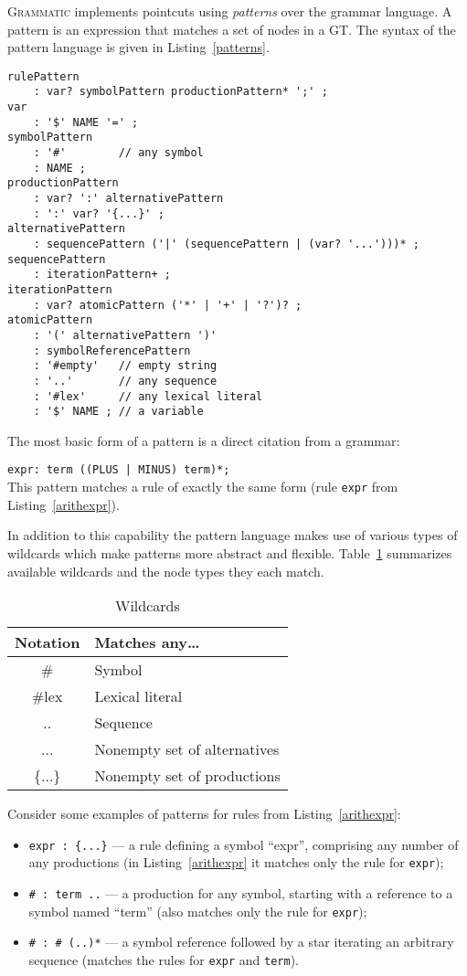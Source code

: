 \documentclass{IOS-Book-Article}     %
\newcommand{\tabref}[1]{Table~\ref{#1}}
\newcommand{\lstref}[1]{Listing~\ref{#1}}
\newcommand{\tool}[1]{\textsc{#1}}
\newcommand{\Grammatic}[0]{\tool{Grammatic}}
\begin{document}
\Grammatic{} implements pointcuts using \emph{patterns} over the grammar language. A pattern is an expression that matches a set of nodes in a GT. The syntax of the pattern language is given in \lstref{patterns}. 
\begin{lstlisting}[language=Grammatic,label=patterns,float,caption=Grammar of the pattern language]
rulePattern 
	: var? symbolPattern productionPattern* ';' ;
var 
	: '$' NAME '=' ;
symbolPattern
	: '#'        // any symbol 
	: NAME ;
productionPattern 
	: var? ':' alternativePattern
	: ':' var? '{...}' ;
alternativePattern 
	: sequencePattern ('|' (sequencePattern | (var? '...')))* ;
sequencePattern
	: iterationPattern+ ;
iterationPattern
	: var? atomicPattern ('*' | '+' | '?')? ;
atomicPattern
	: '(' alternativePattern ')'
	: symbolReferencePattern
	: '#empty'   // empty string
	: '..'       // any sequence
	: '#lex'     // any lexical literal
	: '$' NAME ; // a variable
\end{lstlisting}

The most basic form of a pattern is a direct citation from a grammar:

\lstinline!expr: term ((PLUS | MINUS) term)*;!\\
This pattern matches a rule of exactly the same form (rule \texttt{expr} from \lstref{arithexpr}). 

In addition to this capability the pattern language makes use of various types of wildcards which make patterns more abstract and flexible. \tabref{wildcards} summarizes available wildcards and the node types they each match.

\begin{table}[h!]
\centering
\begin{tabular}{|@{\tt}c|l|}
	\hline
	\bf Notation & \bf Matches any\ldots \\
	\hline
	\# & Symbol \\
	\#lex & Lexical literal \\
	.. & Sequence \\
	... & Nonempty set of alternatives \\
	\{...\} & Nonempty set of productions \\
	\hline
\end{tabular}
\caption{Wildcards}\label{wildcards}
\end{table}

Consider some examples of patterns for rules from \lstref{arithexpr}:
\begin{itemize}
	\item \lstinline!expr : {...}! --- a rule defining a symbol ``expr'', comprising any number of any productions (in \lstref{arithexpr} it matches only the rule for \texttt{expr});
	\item \lstinline!# : term ..! --- a production for any symbol, starting with a reference to a symbol named ``term'' (also matches only the rule for \texttt{expr});
	\item \lstinline!# : # (..)*! --- a symbol reference followed by a star iterating an arbitrary sequence (matches the rules for \texttt{expr} and \texttt{term}).
\end{itemize}
\end{document}
